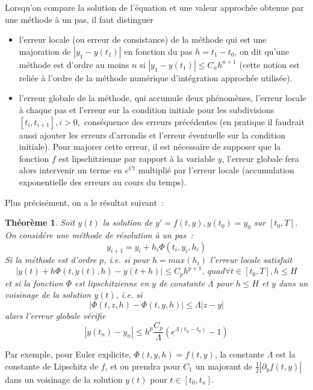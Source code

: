 \documentclass[a4paper,11pt]{article}
\newtheorem{thm}{Théorème}
\begin{document}
Lorsqu'on compare la solution de l'équation et une valeur
approchée obtenue par une méthode à un pas, il faut distinguer 
\begin{itemize}
\item l'erreur locale (ou erreur de consistance)
de la méthode qui est une majoration
de $|y_1-y(t_1)|$ en fonction du pas $h=t_1-t_0$, on dit 
qu'une méthode est d'ordre au moins $n$ si $|y_1-y(t_1)|\leq
C_n h^{n+1}$ (cette notion est reli\'ee \`a l'ordre
de la m\'ethode num\'erique d'int\'egration approch\'ee utilis\'ee).
\item l'erreur globale de la méthode, qui accumule deux phénomènes,
l'erreur locale à chaque pas et l'erreur sur la condition initiale
pour les subdivisions $[t_i,t_{i+1}], i>0,$ cons\'equence des erreurs
pr\'ec\'edentes (en pratique il faudrait aussi ajouter les erreurs
d'arrondis et l'erreur
\'eventuelle sur la condition initiale). Pour majorer cette erreur,
il est nécessaire de supposer que la fonction $f$ est lipschitzienne
par rapport à la variable $y$, l'erreur globale fera alors intervenir
un terme en $e^{Ct}$ multiplié par l'erreur locale
(accumulation exponentielle des erreurs au cours du temps).
\end{itemize}
Plus pr\'ecis\'ement, on a le r\'esultat suivant~:
\begin{thm}
Soit $y(t)$ la solution de $y'=f(t,y), y(t_0)=y_0$ sur $[t_0,T]$.
On consid\'ere une m\'ethode de r\'esolution \`a un pas~:
$$ y_{i+1}=y_i+h_i\Phi(t_i,y_i,h_i)$$ 
Si la m\'ethode est d'ordre $p$, i.e. si pour $h=max(h_i)$ 
l'erreur locale satisfait 
$$|y(t) + h\Phi(t,y(t),h)-y(t+h)|\leq C_p h^{p+1}, \ quad \forall t \in [t_0,T], h \leq H $$ 
et si la fonction $\Phi$ est 
lipschitzienne en $y$ de constante $\Lambda$ pour $h\leq H$ et $y$ dans un 
voisinage de la solution $y(t)$, 
i.e. si
$$ |\Phi(t,z,h)-\Phi(t,y,h)| \leq \Lambda |z-y| $$
alors l'erreur globale v\'erifie
$$ |y(t_n)-y_n| \leq h^p \frac{C_p}{\Lambda}
(e^{\Lambda(t_n-t_0)}-1)$$
\end{thm}
Par exemple, pour Euler explicite, $\Phi(t,y,h)=f(t,y)$, la constante
$\Lambda$ est la constante de Lipschitz de $f$, et on prendra pour
$C_1$ un majorant de $\frac12|\partial_y f(t,y)|$ dans un voisinage de la
solution $y(t)$ pour $t \in [t_0,t_n]$.
\end{document}
